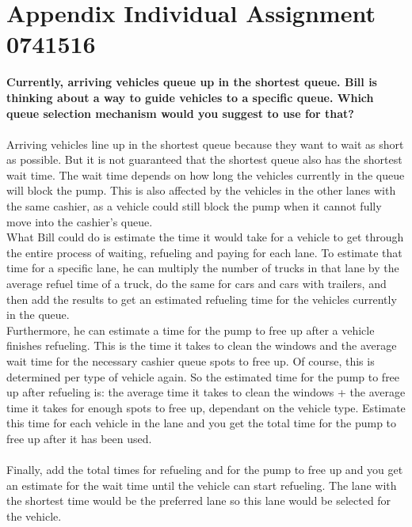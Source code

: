 \section{Appendix Individual Assignment 0741516}\label{app:indivbram}
\textbf{Currently, arriving vehicles queue up in the shortest queue. Bill is thinking about a way to guide vehicles to a specific queue. Which queue selection mechanism would you suggest to use for that?}\\
\\
Arriving vehicles line up in the shortest queue because they want to wait as short as possible. But it is not guaranteed that the shortest queue also has the shortest wait time. The wait time depends on how long the vehicles currently in the queue will block the pump. This is also affected by the vehicles in the other lanes with the same cashier, as a vehicle could still block the pump when it cannot fully move into the cashier's queue.\\
What Bill could do is estimate the time it would take for a vehicle to get through the entire process of waiting, refueling and paying for each lane. To estimate that time for a specific lane, he can multiply the number of trucks in that lane by the average refuel time of a truck, do the same for cars and cars with trailers, and then add the results to get an estimated refueling time for the vehicles currently in the queue.\\
Furthermore, he can estimate a time for the pump to free up after a vehicle finishes refueling. This is the time it takes to clean the windows and the average wait time for the necessary cashier queue spots to free up. Of course, this is determined per type of vehicle again. So the estimated time for the pump to free up after refueling is: the average time it takes to clean the windows + the average time it takes for enough spots to free up, dependant on the vehicle type. Estimate this time for each vehicle in the lane and you get the total time for the pump to free up after it has been used.\\\\
Finally, add the total times for refueling and for the pump to free up and you get an estimate for the wait time until the vehicle can start refueling. The lane with the shortest time would be the preferred lane so this lane would be selected for the vehicle.